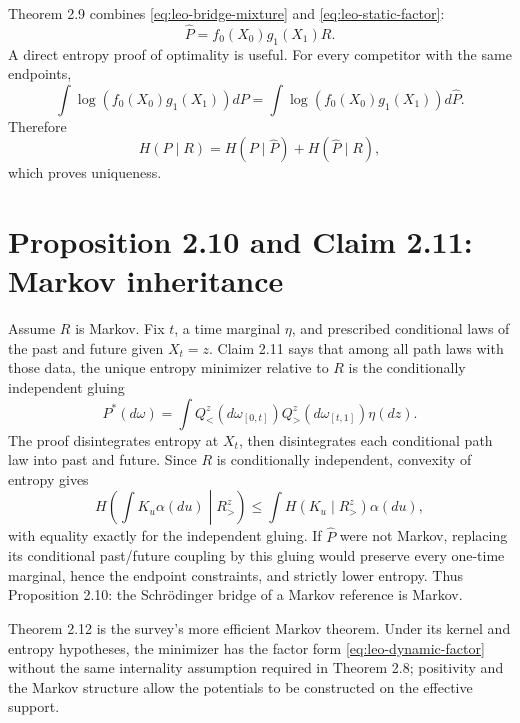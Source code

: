 Theorem 2.9 combines \eqref{eq:leo-bridge-mixture} and \eqref{eq:leo-static-factor}:
\begin{equation}\label{eq:leo-dynamic-factor}
 \widehat P=f_0(X_0)g_1(X_1)R.
\end{equation}
A direct entropy proof of optimality is useful.  For every competitor with the same endpoints,
\[
 \int\log(f_0(X_0)g_1(X_1))dP
 =\int\log(f_0(X_0)g_1(X_1))d\widehat P.
\]
Therefore
\[
 H(P\mid R)=H(P\mid\widehat P)+H(\widehat P\mid R),
\]
which proves uniqueness.

\section{Proposition 2.10 and Claim 2.11: Markov inheritance}
Assume \(R\) is Markov.  Fix \(t\), a time marginal \(\eta\), and prescribed conditional laws of
the past and future given \(X_t=z\).  Claim 2.11 says that among all path laws with those data, the
unique entropy minimizer relative to \(R\) is the conditionally independent gluing
\[
 P^*(d\omega)=\int Q^{z}_{<}(d\omega_{[0,t]})
                  Q^{z}_{>}(d\omega_{[t,1]})\eta(dz).
\]
The proof disintegrates entropy at \(X_t\), then disintegrates each conditional path law into past and
future.  Since \(R\) is conditionally independent, convexity of entropy gives
\[
 H\!\left(\int K_u\alpha(du)\middle|R_{>}^{z}\right)
 \le\int H(K_u\mid R_{>}^{z})\alpha(du),
\]
with equality exactly for the independent gluing.  If \(\widehat P\) were not Markov, replacing its
conditional past/future coupling by this gluing would preserve every one-time marginal, hence the
endpoint constraints, and strictly lower entropy.  Thus Proposition 2.10: the Schr\"odinger bridge of
a Markov reference is Markov.

Theorem 2.12 is the survey's more efficient Markov theorem.  Under its kernel and entropy
hypotheses, the minimizer has the factor form \eqref{eq:leo-dynamic-factor} without the same
internality assumption required in Theorem 2.8; positivity and the Markov structure allow the
potentials to be constructed on the effective support.

